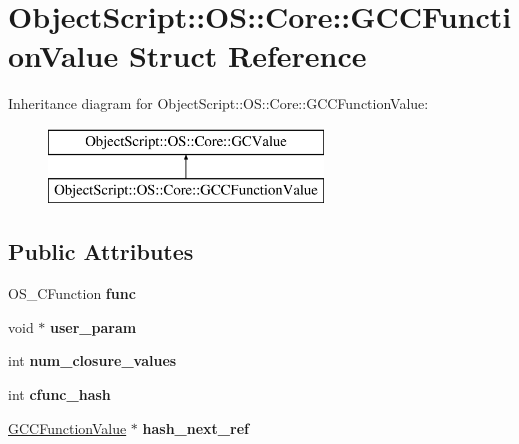 \hypertarget{struct_object_script_1_1_o_s_1_1_core_1_1_g_c_c_function_value}{}\section{Object\+Script\+:\+:OS\+:\+:Core\+:\+:G\+C\+C\+Function\+Value Struct Reference}
\label{struct_object_script_1_1_o_s_1_1_core_1_1_g_c_c_function_value}
Inheritance diagram for Object\+Script\+:\+:OS\+:\+:Core\+:\+:G\+C\+C\+Function\+Value\+:\begin{figure}[H]
\begin{center}
\leavevmode
\includegraphics[height=2.000000cm]{struct_object_script_1_1_o_s_1_1_core_1_1_g_c_c_function_value}
\end{center}
\end{figure}
\subsection*{Public Attributes}
\begin{DoxyCompactItemize}
\item 
O\+S\+\_\+\+C\+Function {\bfseries func}\hypertarget{struct_object_script_1_1_o_s_1_1_core_1_1_g_c_c_function_value_af85a0b0d750982c24508d5dd2bf2e7c8}{}\label{struct_object_script_1_1_o_s_1_1_core_1_1_g_c_c_function_value_af85a0b0d750982c24508d5dd2bf2e7c8}

\item 
void $\ast$ {\bfseries user\+\_\+param}\hypertarget{struct_object_script_1_1_o_s_1_1_core_1_1_g_c_c_function_value_a303affa685e6b2ddc7612141dd73e6dc}{}\label{struct_object_script_1_1_o_s_1_1_core_1_1_g_c_c_function_value_a303affa685e6b2ddc7612141dd73e6dc}

\item 
int {\bfseries num\+\_\+closure\+\_\+values}\hypertarget{struct_object_script_1_1_o_s_1_1_core_1_1_g_c_c_function_value_a1b7e2d8f0553e48b9419d6e000a92d36}{}\label{struct_object_script_1_1_o_s_1_1_core_1_1_g_c_c_function_value_a1b7e2d8f0553e48b9419d6e000a92d36}

\item 
int {\bfseries cfunc\+\_\+hash}\hypertarget{struct_object_script_1_1_o_s_1_1_core_1_1_g_c_c_function_value_a19c564e6001240270913d64c862113cf}{}\label{struct_object_script_1_1_o_s_1_1_core_1_1_g_c_c_function_value_a19c564e6001240270913d64c862113cf}

\item 
\hyperlink{struct_object_script_1_1_o_s_1_1_core_1_1_g_c_c_function_value}{G\+C\+C\+Function\+Value} $\ast$ {\bfseries hash\+\_\+next\+\_\+ref}\hypertarget{struct_object_script_1_1_o_s_1_1_core_1_1_g_c_c_function_value_aeb5432bfc1f1ffe9803815337754012c}{}\label{struct_object_script_1_1_o_s_1_1_core_1_1_g_c_c_function_value_aeb5432bfc1f1ffe9803815337754012c}

\end{DoxyCompactItemize}


